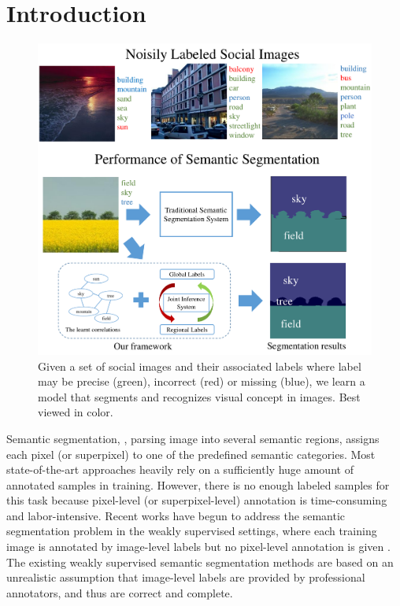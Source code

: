 \section{Introduction}

\begin{figure}[t]
\begin{center}
    \includegraphics[width=1\linewidth]{fig_noisyparsing.pdf}
\end{center}
    \caption{Given a set of social images and their associated labels where label may be precise (green), incorrect (red) or missing (blue), we learn a model that segments and recognizes visual concept in images. Best viewed in color.}
\label{fig:noisyparsing}
\vspace{-3mm}
\end{figure}

Semantic segmentation, \ie, parsing image into several semantic regions, assigns each pixel (or superpixel) to one of the predefined semantic categories.
Most state-of-the-art approaches heavily rely on a sufficiently huge amount of annotated samples in training.
However, there is no enough labeled samples for this task because pixel-level (or superpixel-level) annotation is time-consuming and labor-intensive. 
Recent works have begun to address the semantic segmentation problem in the weakly supervised settings, where each training image is annotated by image-level labels but no pixel-level annotation is given \cite{verbeek2007region,vezhnevets2010towards,vezhnevets2011weakly,vezhnevets2012weakly,xu2014tell,zhang2013sparse,zhang2013probabilistic}. 
The existing weakly supervised semantic segmentation methods are based on an unrealistic assumption that image-level labels are provided by professional annotators, and thus are correct and complete.


